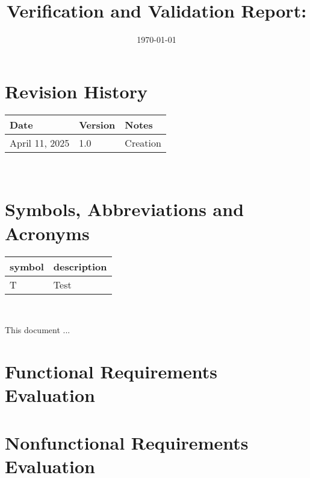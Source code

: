 \documentclass[12pt, titlepage]{article}
\begin{document}
\title{Verification and Validation Report: \progname} 
\author{\authname}
\date{\today}
	
\maketitle


\section{Revision History}

\begin{tabularx}{\textwidth}{p{3cm}p{2cm}X} \toprule {\bf Date} & {\bf Version}
& {\bf Notes}\\
\midrule
April 11, 2025 & 1.0 & Creation\\
\bottomrule
\end{tabularx}

~\newpage

\section{Symbols, Abbreviations and Acronyms}

\renewcommand{\arraystretch}{1.2}
\begin{tabular}{l l} 
  \toprule		
  \textbf{symbol} & \textbf{description}\\
  \midrule 
  T & Test\\
  \bottomrule
\end{tabular}\\


\newpage

\tableofcontents

\listoftables %

\listoffigures %

\newpage


This document ...

\section{Functional Requirements Evaluation}

\section{Nonfunctional Requirements Evaluation}
\end{document}
